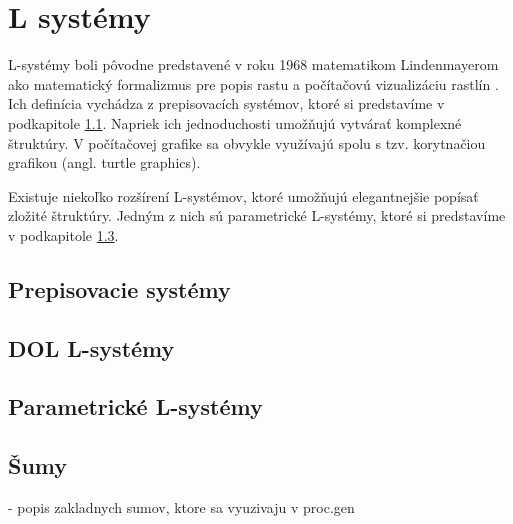 \chapter{L systémy}
L-systémy boli pôvodne predstavené v roku 1968 matematikom Lindenmayerom ako matematický formalizmus pre popis rastu a počítačovú vizualizáciu rastlín \cite{Lsystems}.
Ich definícia vychádza z prepisovacích systémov, ktoré si predstavíme v podkapitole \ref{rewriting}.
Napriek ich jednoduchosti umožňujú vytvárať komplexné štruktúry. V počítačovej grafike sa obvykle využívajú spolu s tzv. korytnačiou grafikou (angl. turtle graphics).

Existuje niekoľko rozšírení L-systémov, ktoré umožňujú elegantnejšie popísať zložité štruktúry. Jedným z nich sú parametrické L-systémy, ktoré si predstavíme v podkapitole
\ref{parametric}.

\section{Prepisovacie systémy}\label{rewriting}
\section{DOL L-systémy}\label{dollsystems}
\section{Parametrické L-systémy}\label{parametric}
\section{Šumy}
		- popis zakladnych sumov, ktore sa vyuzivaju v proc.gen


